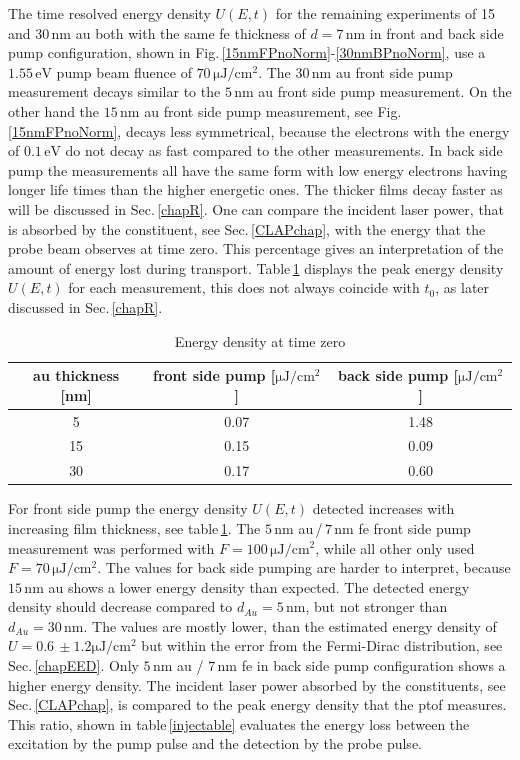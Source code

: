 \documentclass[a4paper,12pt,twoside]{article}
\begin{document}
\noindent
The time resolved energy density $U(E,t)$ for the remaining experiments of 15 and $30\,\mathrm{nm}$ \gls{au} both with the same \gls{fe} thickness of $d = 7\,\mathrm{nm}$ in front and back side pump configuration, shown in Fig.\,\ref{15nmFPnoNorm}-\ref{30nmBPnoNorm}, use a $1.55\,\mathrm{eV}$ pump beam fluence of $70\,\mathrm{\mu J/cm^2}$. The $30\,\mathrm{nm}$ \gls{au} front side pump measurement decays similar to the $5\,\mathrm{nm}$ \gls{au} front side pump measurement. On the other hand the $15\,\mathrm{nm}$ \gls{au} front side pump measurement, see Fig.\,\ref{15nmFPnoNorm}, decays less symmetrical, because the electrons with the energy of $0.1\,\mathrm{eV}$ do not decay as fast compared to the other measurements. In back side pump the measurements all have the same form with low energy electrons having longer life times than the higher energetic ones. The thicker films decay faster as will be discussed in Sec.\,\ref{chapR}.
 One can compare the incident laser power, that is absorbed by the constituent, see Sec.\,\ref{CLAPchap}, with the energy that the probe beam observes at time zero. This percentage gives an interpretation of the amount of energy lost during transport. Table\,\ref{tabledensity} displays the peak energy density $U(E,t)$ for each measurement, this does not always coincide with $t_0$, as later discussed in Sec.\,\ref{chapR}.
 	    \begin{table}[H]
	    \centering
		    \caption{Energy density at time zero}
		    \vspace{3mm}
		    \begin{tabular}{ccc}
			    \gls{au} thickness [nm] & front side pump [$\mathrm{\mu J/cm^{2}}$] & back side pump [$\mathrm{\mu J/cm^{2}}$] \\
		    	\hline
		    	5 & 0.07 & 1.48 \\
		    	15 & 0.15 & 0.09 \\
		    	30 & 0.17 & 0.60 \\
		    \end{tabular}
		        \label{tabledensity}
        \end{table}
For front side pump the energy density $U(E,t)$ detected increases with increasing film thickness, see table\,\ref{tabledensity}. The $5\,\mathrm{nm}$ \gls{au}\,/\,$7\,\mathrm{nm}$ \gls{fe} front side pump measurement was performed with $F = 100\,\mathrm{\mu J/cm^{2}}$, while all other only used $F = 70\,\mathrm{\mu J/cm^{2}}$. The values for back side pumping are harder to interpret, because $15\,\mathrm{nm}$ \gls{au} shows a lower energy density than expected. The detected energy density should decrease compared to $d_{Au} = 5\,\mathrm{nm}$, but not stronger than $d_{Au} = 30\,\mathrm{nm}$. The values are mostly lower, than the estimated energy density of $U = 0.6\,\pm1.2\mathrm{\mu J/cm^2}$ but within the error from the Fermi-Dirac distribution, see Sec.\,\ref{chapEED}. Only $5\,\mathrm{nm}$ \gls{au} / $7\,\mathrm{nm}$ \gls{fe} in back side pump configuration shows a higher energy density. The incident laser power absorbed by the constituents, see Sec.\,\ref{CLAPchap}, is compared to the peak energy density that the \gls{ptof} measures. This ratio, shown in table\,\ref{injectable} evaluates the energy loss between the excitation by the pump pulse and the detection by the probe pulse.
\end{document}
